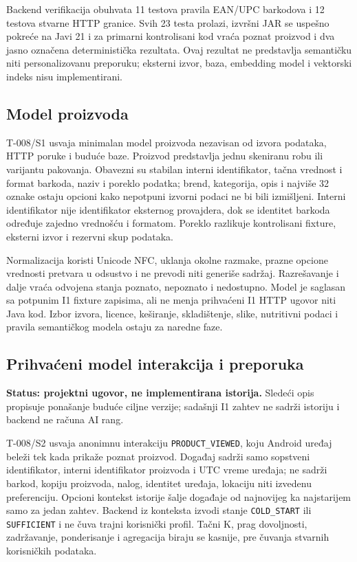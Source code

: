 \documentclass[12pt,a4paper]{article}
\begin{document}
Backend verifikacija obuhvata 11 testova pravila EAN/UPC barkodova i 12 testova stvarne HTTP granice. Svih 23 testa prolazi, izvršni JAR se uspešno pokreće na Javi 21 i za primarni kontrolisani kod vraća poznat proizvod i dva jasno označena deterministička rezultata. Ovaj rezultat ne predstavlja semantičku niti personalizovanu preporuku; eksterni izvor, baza, embedding model i vektorski indeks nisu implementirani.

\subsection{Model proizvoda}

T-008/S1 usvaja minimalan model proizvoda nezavisan od izvora podataka, HTTP poruke i buduće baze. Proizvod predstavlja jednu skeniranu robu ili varijantu pakovanja. Obavezni su stabilan interni identifikator, tačna vrednost i format barkoda, naziv i poreklo podatka; brend, kategorija, opis i najviše 32 oznake ostaju opcioni kako nepotpuni izvorni podaci ne bi bili izmišljeni. Interni identifikator nije identifikator eksternog provajdera, dok se identitet barkoda određuje zajedno vrednošću i formatom. Poreklo razlikuje kontrolisani fixture, eksterni izvor i rezervni skup podataka.

Normalizacija koristi Unicode NFC, uklanja okolne razmake, prazne opcione vrednosti pretvara u odsustvo i ne prevodi niti generiše sadržaj. Razrešavanje i dalje vraća odvojena stanja poznato, nepoznato i nedostupno. Model je saglasan sa potpunim I1 fixture zapisima, ali ne menja prihvaćeni I1 HTTP ugovor niti Java kod. Izbor izvora, licence, keširanje, skladištenje, slike, nutritivni podaci i pravila semantičkog modela ostaju za naredne faze.

\subsection{Prihvaćeni model interakcija i preporuka}

\textbf{Status: projektni ugovor, ne implementirana istorija.} Sledeći opis propisuje ponašanje buduće ciljne verzije; sadašnji I1 zahtev ne sadrži istoriju i backend ne računa AI rang.

T-008/S2 usvaja anonimnu interakciju \texttt{PRODUCT\_VIEWED}, koju Android uređaj beleži tek kada prikaže poznat proizvod. Događaj sadrži samo sopstveni identifikator, interni identifikator proizvoda i UTC vreme uređaja; ne sadrži barkod, kopiju proizvoda, nalog, identitet uređaja, lokaciju niti izvedenu preferenciju. Opcioni kontekst istorije šalje događaje od najnovijeg ka najstarijem samo za jedan zahtev. Backend iz konteksta izvodi stanje \texttt{COLD\_START} ili \texttt{SUFFICIENT} i ne čuva trajni korisnički profil. Tačni K, prag dovoljnosti, zadržavanje, ponderisanje i agregacija biraju se kasnije, pre čuvanja stvarnih korisničkih podataka.
\end{document}
